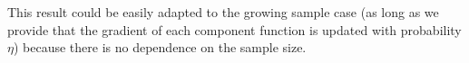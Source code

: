 \documentclass{article}
\begin{document}
% 
% 
% 
% 
% 



\bigskip\bigskip

\noindent
This result could be easily adapted to the growing sample case (as long as we provide that the gradient of each component function is updated with probability $\eta$) because there is no dependence on the sample size.


%  
\end{document}
